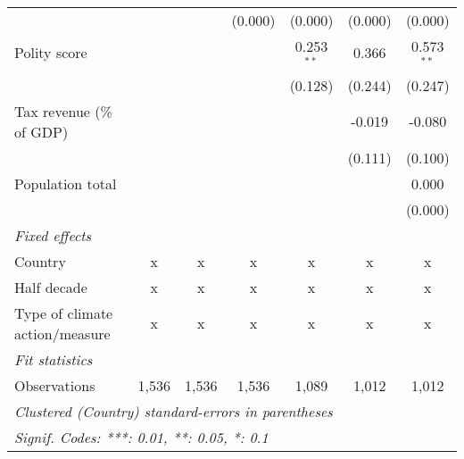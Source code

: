 \begin{tabular}{lcccccc}
                                                                               &               &                & (0.000)       & (0.000)      & (0.000)      & (0.000)\\   
   Polity score                                                                &               &                &               & 0.253$^{**}$ & 0.366        & 0.573$^{**}$\\   
                                                                               &               &                &               & (0.128)      & (0.244)      & (0.247)\\   
   Tax revenue (\% of GDP)                                                     &               &                &               &              & -0.019       & -0.080\\   
                                                                               &               &                &               &              & (0.111)      & (0.100)\\   
   Population total                                                            &               &                &               &              &              & 0.000\\   
                                                                               &               &                &               &              &              & (0.000)\\   
   \emph{Fixed effects}\\
   Country                                                                     & x             & x              & x             & x            & x            & x\\  
   Half decade                                                                 & x             & x              & x             & x            & x            & x\\  
   Type of climate action/measure                                              & x             & x              & x             & x            & x            & x\\  
   \midrule \emph{Fit statistics}\\
   Observations                                                                & 1,536         & 1,536          & 1,536         & 1,089        & 1,012        & 1,012\\  
   \midrule
   \multicolumn{7}{l}{\emph{Clustered (Country) standard-errors in parentheses}}\\
   \multicolumn{7}{l}{\emph{Signif. Codes: ***: 0.01, **: 0.05, *: 0.1}}\\
\end{tabular}
\par\endgroup


